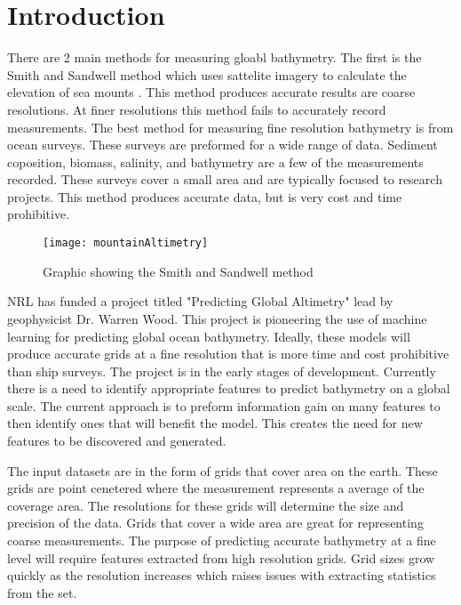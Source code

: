 \section{Introduction}
There are 2 main methods for measuring gloabl bathymetry.
The first is the Smith and Sandwell method which uses sattelite imagery to calculate the elevation of sea mounts \cite{sandwell}.
This method produces accurate results are coarse resolutions.
At finer resolutions this method fails to accurately record measurements.
The best method for measuring fine resolution bathymetry is from ocean surveys.
These surveys are preformed for a wide range of data.
Sediment coposition, biomass, salinity, and bathymetry are a few of the measurements recorded.
These surveys cover a small area and are typically focused to research projects. 
This method produces accurate data, but is very cost and time prohibitive. 
\begin{figure}[hb]
    \centering
    \texttt{[image: mountainAltimetry]}
    \caption{Graphic showing the Smith and Sandwell method}
  \end{figure}

\par
NRL has funded a project titled "Predicting Global Altimetry" lead by geophysicist Dr. Warren Wood.
This project is pioneering the use of machine learning for predicting global ocean bathymetry.
Ideally, these models will produce accurate grids at a fine resolution that is more time and cost prohibitive than ship surveys.
The project is in the early stages of development. 
Currently there is a need to identify appropriate features to predict bathymetry on a global scale. 
The current approach is to preform information gain on many features to then identify ones that will benefit the model.
This creates the need for new features to be discovered and generated. 

\par
The input datasets are in the form of grids that cover area on the earth. 
These grids are point cenetered where the measurement represents a average of the coverage area.
The resolutions for these grids will determine the size and precision of the data.
Grids that cover a wide area are great for representing coarse measurements.
The purpose of predicting accurate bathymetry at a fine level will require features extracted from high resolution grids.
Grid sizes grow quickly as the resolution increases which raises issues with extracting statistics from the set.
